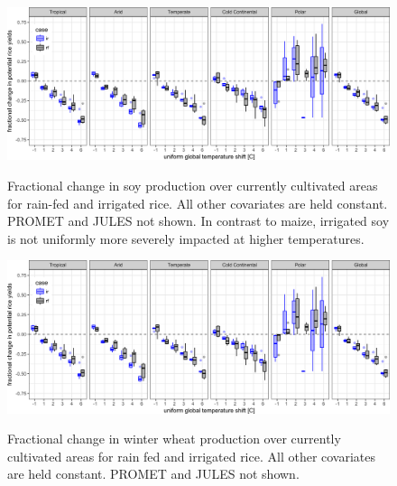 \documentclass[10pt]{article}
\begin{document}
\begin{figure}[h!]
\includegraphics[width=\textwidth]{s_rice_sim_CG_area_weight.png}\\
\caption{Fractional change in soy production over currently cultivated areas for rain-fed and irrigated rice. All other covariates are held constant. PROMET and JULES not shown. In contrast to maize, irrigated soy is not uniformly more severely impacted at higher temperatures.}
\label{fig:soy_currentcult}
\end{figure}

\begin{figure}[h!]
\includegraphics[width=\textwidth]{s_rice_sim_CG_area_weight.png}\\
\caption{Fractional change in winter wheat production over currently cultivated areas for rain fed and irrigated rice. All other covariates are held constant. PROMET and JULES not shown.}
\label{fig:winter_wheat_currentcult}
\end{figure}
\end{document}
